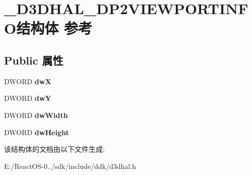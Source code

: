\hypertarget{struct___d3_d_h_a_l___d_p2_v_i_e_w_p_o_r_t_i_n_f_o}{}\section{\+\_\+\+D3\+D\+H\+A\+L\+\_\+\+D\+P2\+V\+I\+E\+W\+P\+O\+R\+T\+I\+N\+F\+O结构体 参考}
\label{struct___d3_d_h_a_l___d_p2_v_i_e_w_p_o_r_t_i_n_f_o}
\subsection*{Public 属性}
\begin{DoxyCompactItemize}
\item 
\mbox{\label{struct___d3_d_h_a_l___d_p2_v_i_e_w_p_o_r_t_i_n_f_o_a5bb9ca411b5540f66fc977589b4f740c}} 
D\+W\+O\+RD {\bfseries dwX}
\item 
\mbox{\label{struct___d3_d_h_a_l___d_p2_v_i_e_w_p_o_r_t_i_n_f_o_a9e87beae29db997a23966670cd551d70}} 
D\+W\+O\+RD {\bfseries dwY}
\item 
\mbox{\label{struct___d3_d_h_a_l___d_p2_v_i_e_w_p_o_r_t_i_n_f_o_a0811f3f1d36b396dfe3f9171c27283d3}} 
D\+W\+O\+RD {\bfseries dw\+Width}
\item 
\mbox{\label{struct___d3_d_h_a_l___d_p2_v_i_e_w_p_o_r_t_i_n_f_o_a3eefd6b766e43290f6838bd42a5ff347}} 
D\+W\+O\+RD {\bfseries dw\+Height}
\end{DoxyCompactItemize}


该结构体的文档由以下文件生成\+:\begin{DoxyCompactItemize}
\item 
E\+:/\+React\+O\+S-\/0../sdk/include/ddk/d3dhal.\+h\end{DoxyCompactItemize}
